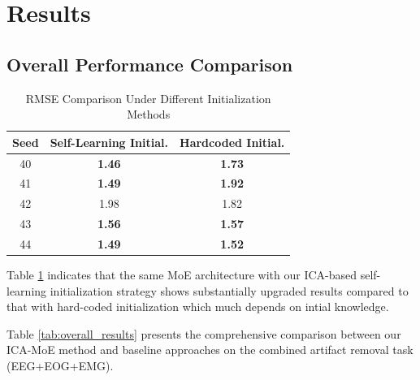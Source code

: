 \documentclass{article}
\begin{document}
\section{Results}
\label{sec:results}

\subsection{Overall Performance Comparison}

\begin{table}[!t]
\centering
\caption{RMSE Comparison Under Different Initialization Methods}
\label{tab:rmse_init}
\begin{tabular}{ccc}
\toprule
\textbf{Seed} & \textbf{Self-Learning Initial.} & \textbf{Hardcoded Initial.} \\
\midrule
40 & \textbf{1.46} & \textbf{1.73} \\
41 & \textbf{1.49} & \textbf{1.92} \\
42 & 1.98 & 1.82 \\
43 & \textbf{1.56} & \textbf{1.57} \\
44 & \textbf{1.49} & \textbf{1.52} \\
\bottomrule
\end{tabular}
\end{table}

Table \ref{tab:rmse_init} indicates that the same MoE architecture with our ICA-based self-learning initialization strategy shows substantially upgraded results compared to that with hard-coded initialization which much depends on intial knowledge.

Table \ref{tab:overall_results} presents the comprehensive comparison between our ICA-MoE method and baseline approaches on the combined artifact removal task (EEG+EOG+EMG).
\end{document}

